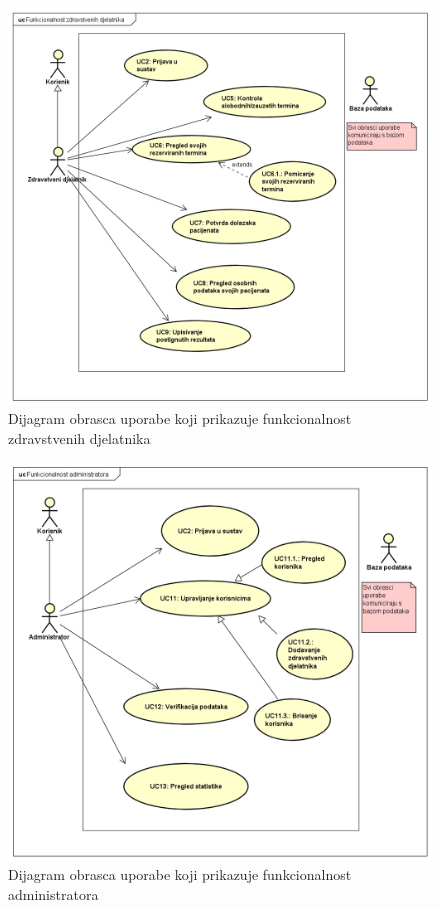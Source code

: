 					\begin{figure}[H]
						\includegraphics[scale=0.6]{slike/ZdravstveniDjelatnik.PNG} %
						\centering
						\caption{Dijagram obrasca uporabe koji prikazuje funkcionalnost zdravstvenih djelatnika}
						\label{fig:promjene}
					\end{figure}
					
					\begin{figure}[H]
						\includegraphics[scale=0.6]{slike/Administrator.PNG} %
						\centering
						\caption{Dijagram obrasca uporabe koji prikazuje funkcionalnost administratora}
						\label{fig:promjene}
					\end{figure}
			
